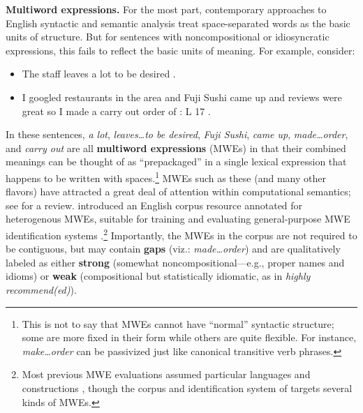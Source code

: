 \documentclass[11pt]{article}
\newcommand{\lex}[1]{\textit{#1}} %
\begin{document}
\textbf{Multiword expressions.} 
For the most part, contemporary approaches to English syntactic and semantic analysis
treat space-separated words as the basic units of structure. 
But for sentences with noncompositional or idiosyncratic expressions, this fails to reflect 
the basic units of meaning. For example, consider:
\begin{itemize}[labelindent=2em]
\item[(1)] The staff leaves a lot to be desired .
\item[(2)] \raggedright I googled restaurants in the area and Fuji Sushi came up and reviews were great so I made a carry out order of : L 17 .
\end{itemize}
In these sentences, \lex{a lot}, \lex{leaves\ldots to be desired}, 
\lex{Fuji Sushi}, \lex{came up}, \lex{made\ldots order}, and \lex{carry out}
are all \textbf{multiword expressions} (MWEs) 
in that their combined meanings can be thought of as ``prepackaged'' 
in a single lexical expression that happens to be written with spaces.\footnote{This is not to say that MWEs cannot have ``normal'' 
syntactic structure; some are more fixed in their form while others are quite flexible. 
For instance, \lex{make\ldots order} can be passivized just like canonical transitive verb phrases.}
MWEs such as these (and many other flavors) have attracted a great deal of attention 
within computational semantics; see \citet{baldwin-10} for a review.
 introduced an English corpus resource annotated for heterogenous MWEs, 
suitable for training and evaluating general-purpose MWE identification systems \citep{schneider-14}.\footnote{Most 
previous MWE evaluations assumed 
particular languages and constructions \citep[recently:][]{constant-11,green-12,ramisch-12,vincze-13},
though the corpus and identification system of \citet{vincze-11} targets several kinds of MWEs.}
Importantly, the MWEs in the corpus are not required to be contiguous, 
but may contain \textbf{gaps} (viz.: \lex{made\ldots order}) 
and are qualitatively labeled as either \textbf{strong} (somewhat noncompositional---e.g., proper names and idioms) 
or \textbf{weak} (compositional but statistically idiomatic, as in \lex{highly recommend(ed)}).
\end{document}
